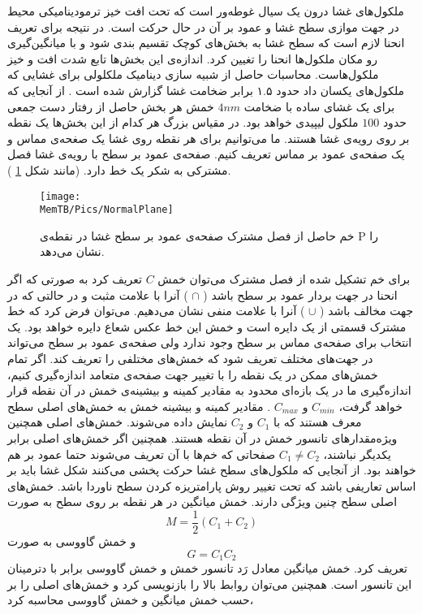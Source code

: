 ملکول‌های غشا درون یک سیال غوطه‌ور است که تحت افت خیز ترمودینامیکی محیط در جهت‌ موازی سطح غشا و عمود بر آن در حال حرکت است. در نتیجه برای تعریف انحنا لازم است که سطح غشا به بخش‌های کوچک تقسیم بندی شود و با میانگین‌گیری رو  مکان ملکول‌ها انحنا را تغیین کرد. اندازه‌ی این بخش‌ها تابع شدت افت و خیز ملکول‌هاست. محاسبات حاصل از  شبیه‌ سازی دینامیک ملکلولی برای غشایی که ملکول‌های یکسان داد حدود ۱.۵ برابر ضخامت غشا گزارش شده است
\cite{Goetz1998}
. از آنجایی که برای یک غشای ساده با ضخامت 
$4nm$
خمش هر بخش حاصل از رفتار دست جمعی حدود 
$100$
ملکول لیپیدی خواهد بود. در مقیاس بزرگ هر کدام از این بخش‌ها یک نقطه بر روی رویه‌ی غشا هستند. ما می‌توانیم برای هر نقطه روی غشا یک صغحه‌ی مماس و یک صفحه‌ی عمود بر مماس تعریف کنیم. صفحه‌ی عمود بر سطح با رویه‌ی غشا فصل مشترکی به شکر یک خط دارد.  (مانند شکل 
\ref{fig:normalPlaneIntersection}
).
\begin{figure}[h]
\begin{center}
\texttt{[image: \\MemTB/Pics/NormalPlane]}
\caption{
خم حاصل از فصل مشترک صفحه‌ی عمود بر سطح غشا در نقطه‌ی 
P
را نشان می‌دهد.
}
\label{fig:normalPlaneIntersection}
\end{center}
\end{figure}
برای خم تشکیل شده از فصل مشترک می‌توان خمش
$C$
تعریف کرد به صورتی که اگر انحنا در جهت بردار عمود بر سطح باشد (
$\cap$
) آنرا با علامت مثبت و در حالتی که در جهت مخالف باشد (
$\cup$
) آنرا با علامت منفی نشان می‌دهیم. می‌توان فرض کرد که خط مشترک قسمتی از یک دایره  است و خمش این خط عکس شعاع دایره خواهد بود. یک انتخاب برای صفحه‌ی مماس بر سطح وجود ندارد ولی صفحه‌ی عمود بر سطح می‌تواند در جهت‌های مختلف تعریف شود که خمش‌های مختلفی را تعریف کند. اگر تمام خمش‌های ممکن در یک نقطه‌ را با تغییر جهت صفحه‌ی متعامد اندازه‌گیری کنیم، اندازه‌گیری ما در یک بازه‌ای محدود به مقادیر کمینه و بیشینه‌ی خمش در آن نقطه قرار خواهد گرفت،
$C_{min}$
و
$C_{max}$
. مقادیر کمینه و بیشینه خمش به خمش‌های اصلی سطح معرف هستند که با 
$C_1$
و
$C_2$
نمایش داده می‌شوند. خمش‌های اصلی همچنین  ویژه‌مقدار‌های تانسور خمش در آن نقطه هستند. همچنین اگر خمش‌های اصلی برابر یکدیگر نباشند،
$C_1\neq C_2$ 
صفحاتی که خم‌ها با آن تعریف می‌شوند حتما عمود بر هم خواهند بود. از آنجایی که ملکول‌های سطح غشا حرکت پخشی می‌کنند  شکل غشا باید بر اساس تعاریفی باشد که تحت تغییر روش پارامتریزه
 کردن سطح ناوردا باشد. خمش‌های اصلی سطح چنین ویژگی دارند. خمش میانگین در هر نقطه‌ بر روی سطح به صورت 
\begin{equation}
M=\frac{1}{2}(C_1+C_2)
\label{eq:meanCurv}
\end{equation}
و خمش گاووسی به صورت
\begin{equation}
G=C_1C_2
\label{eq:gaussianCurv}
\end{equation}
 تعریف کرد. خمش میانگین معادل رَد
 تانسور خمش و خمش گاووسی برابر با دترمینان این تانسور است. همچنین می‌توان روابط بالا را بازنویسی کرد و خمش‌های اصلی را بر حسب خمش میانگین و خمش گاووسی محاسبه کرد،


